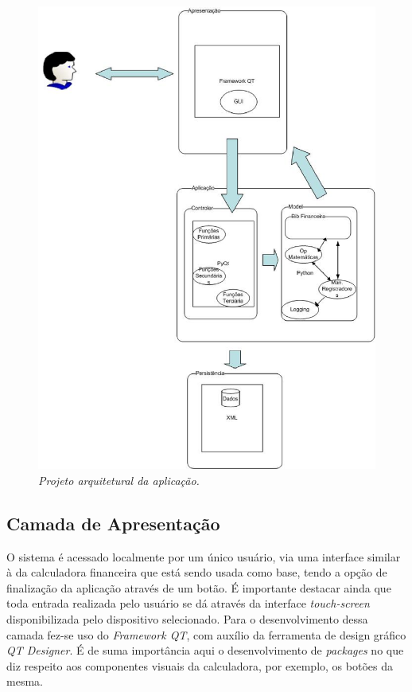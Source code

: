 \begin{figure}[!h]
 \centering
 \includegraphics[scale=0.5]{arquitetura.eps}
 \caption{\it Projeto arquitetural da aplicação.} \label{fig:arquit}
\end{figure}

\subsection{Camada de Apresentação}
O sistema é acessado localmente por um único usuário, via uma interface similar à da calculadora financeira que está sendo usada como base, tendo a opção de finalização da aplicação através de um botão. É importante destacar ainda que toda entrada realizada pelo usuário se dá através da interface \textit{touch-screen} disponibilizada pelo dispositivo selecionado.
Para o desenvolvimento dessa camada fez-se uso do \textit{Framework QT}, com auxílio da ferramenta de design gráfico \textit{QT Designer}. É de suma importância aqui o desenvolvimento de \textit{packages} no que diz respeito aos componentes visuais da calculadora, por exemplo, os botões da mesma.

